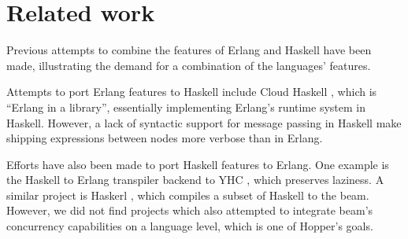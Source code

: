 \section{Related work}
Previous attempts to combine the features of Erlang and Haskell have been made, illustrating the demand for a combination of the languages' features.

Attempts to port Erlang features to Haskell include Cloud Haskell \cite{cloudhaskell}, which is ``Erlang in a library'', essentially implementing Erlang's runtime system in Haskell. However, a lack of syntactic support for message passing in Haskell make shipping expressions between nodes more verbose than in Erlang.

Efforts have also been made to port Haskell features to Erlang. One example is the Haskell to Erlang transpiler backend to YHC \cite{yhc}, which preserves laziness. A similar project is Haskerl \cite{haskerl}, which compiles a subset of Haskell to the \gls{beam}. However, we did not find projects which also attempted to integrate \gls{beam}'s concurrency capabilities on a language level, which is one of Hopper's goals.